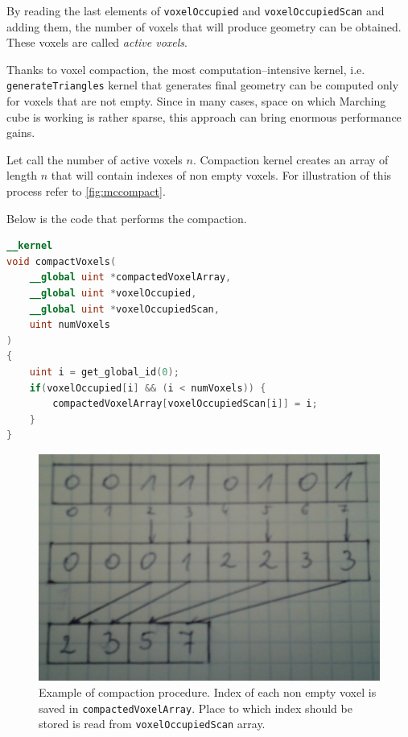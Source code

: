 By reading the last elements of \texttt{voxelOccupied} and
\texttt{voxelOccupiedScan} and adding them, the number of voxels that will
produce geometry can be obtained. These voxels are called \emph{active voxels}.

Thanks to voxel compaction, the most computation--intensive kernel, i.e.
\texttt{generateTriangles} kernel that generates final geometry can be computed
only for voxels that are not empty. Since in many cases, space on which Marching
cube is working is rather sparse, this approach can bring enormous performance
gains.

Let call the number of active voxels $n$. Compaction kernel creates an array
of length $n$ that will contain indexes of non empty voxels. For illustration of
this process refer to \autoref{fig:mccompact}.

Below is the code that performs the compaction.
\begin{lstlisting}[language=opencl]
__kernel
void compactVoxels(
	__global uint *compactedVoxelArray,
	__global uint *voxelOccupied,
	__global uint *voxelOccupiedScan,
	uint numVoxels
)
{
	uint i = get_global_id(0);
	if(voxelOccupied[i] && (i < numVoxels)) {
		compactedVoxelArray[voxelOccupiedScan[i]] = i;
	}
}
\end{lstlisting}

\begin{figure}
	\begin{center}
		\includegraphics[width=\textwidth]{chapters/marchingcubes/compact.jpg}
	\end{center}
	\caption{Example of compaction procedure. Index of each non empty voxel
		is saved in \texttt{compactedVoxelArray}. Place to which index
		should be stored is read from \texttt{voxelOccupiedScan} array.
	}
	\label{fig:mccompact}
\end{figure}

